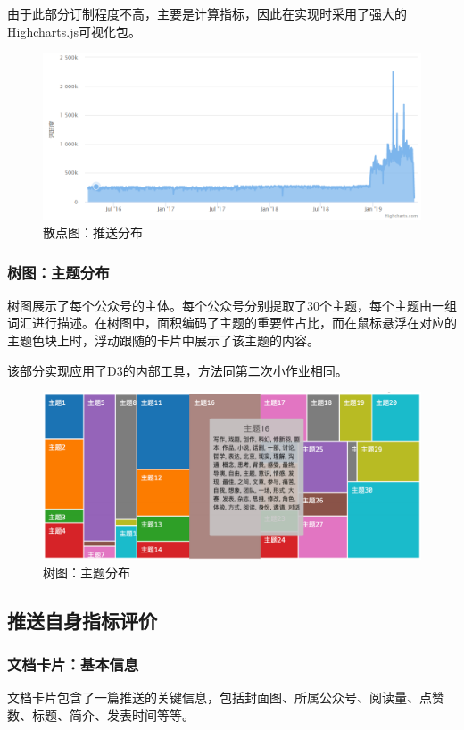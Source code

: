 \documentclass[a4paper,12pt]{article}
\begin{document}
    由于此部分订制程度不高，主要是计算指标，因此在实现时采用了强大的Highcharts.js可视化包。
    \begin{figure}
      \centering
      \includegraphics[width=0.95\linewidth]{zxt.png}
      \caption{散点图：推送分布}
      \label{fig:zxt}
    \end{figure}
    \subsubsection{树图：主题分布}
    树图展示了每个公众号的主体。每个公众号分别提取了30个主题，每个主题由一组词汇进行描述。在树图中，面积编码了主题的重要性占比，而在鼠标悬浮在对应的主题色块上时，浮动跟随的卡片中展示了该主题的内容。

    该部分实现应用了D3的内部工具，方法同第二次小作业相同。

    \begin{figure}
      \centering
      \includegraphics[width=0.95\linewidth]{st.png}
      \caption{树图：主题分布}
      \label{fig:st}
    \end{figure}
    \subsection{推送自身指标评价}
    \subsubsection{文档卡片：基本信息}
    文档卡片包含了一篇推送的关键信息，包括封面图、所属公众号、阅读量、点赞数、标题、简介、发表时间等等。
\end{document}
